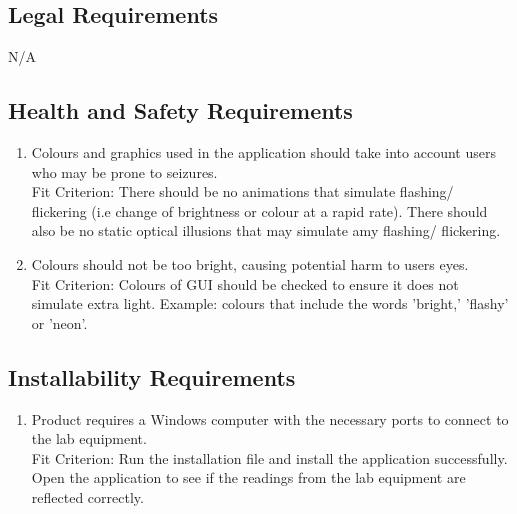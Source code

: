 \documentclass[12pt, titlepage]{article}
\begin{document}
\subsection{Legal Requirements}
\begin{adjustwidth}{2.7em}{0pt}
\begin{enumerate}[{NFR-LR}1.]
    N/A
\end{enumerate}
\end{adjustwidth}

\subsection{Health and Safety Requirements}
\begin{adjustwidth}{2.2em}{0pt}
\begin{enumerate}[{NFR-H}1.]
  \item Colours and graphics used in the application should take into account users who may be prone to seizures. \\
    Fit Criterion: There should be no animations that simulate flashing/ flickering (i.e change of brightness or colour at a rapid rate). There should also be no static optical illusions that may simulate amy flashing/ flickering.
    \item Colours should not be too bright, causing potential harm to users eyes. \\
    Fit Criterion: Colours of GUI should be checked to ensure it does not simulate extra light. Example: colours that include the words 'bright,' 'flashy' or 'neon'.
\end{enumerate}
\end{adjustwidth}

\subsection{Installability Requirements}
\begin{adjustwidth}{2.0em}{0pt}
\begin{enumerate}[{NFR-I}1.]
  \item Product requires a Windows computer with the necessary ports to connect to the lab equipment. \\
    Fit Criterion: Run the installation file and install the application successfully. Open the application to see if the readings from the lab equipment are reflected correctly.
\end{enumerate}
\end{adjustwidth}
\end{document}
